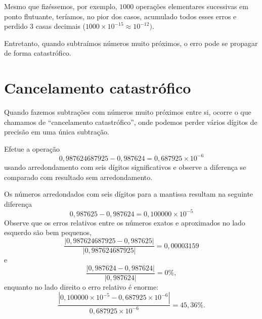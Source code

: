 
Mesmo que fizéssemos, por exemplo, $1000$ operações elementares sucessivas em ponto flutuante, teríamos, no pior dos casos, acumulado todos esses erros e perdido $3$ casas decimais ($1000\times 10^{-15} \approx 10^{-12})$.

Entretanto, quando subtraímos números muito próximos, o erro pode se propagar de forma catastrófico.

\section{Cancelamento catastrófico}

Quando fazemos subtrações com números muito próximos entre si, ocorre o que chamamos de ``cancelamento catastrófico'', onde podemos perder vários dígitos de precisão em uma única subtração.

\begin{ex}Efetue a operação
  \begin{equation*}
    0,987624687925-0,987624=0,687925\times 10^{-6}    
  \end{equation*}
usando arredondamento com seis dígitos significativos e observe a diferença se comparado com resultado sem arredondamento.
\end{ex}
\begin{sol}
Os números arredondados com seis dígitos para a mantissa resultam na seguinte diferença
$$
0,987625-0,987624=0,100000\times 10^{-5}
$$
Observe que os erros relativos entre os números exatos e aproximados no lado esquerdo são bem pequenos,
\begin{equation*}
  \frac{|0,987624687925-0,987625|}{|0,987624687925|}=0,00003159  
\end{equation*}
e
\begin{equation*}
  \frac{|0,987624-0,987624|}{|0,987624|}=0\%,
\end{equation*}
enquanto no lado direito o erro relativo é enorme:
\begin{equation*}
\frac{|0,100000\times 10^{-5}-0,687925\times 10^{-6}|}{0,687925\times 10^{-6}}=45,36\%.  
\end{equation*}
\end{sol}

